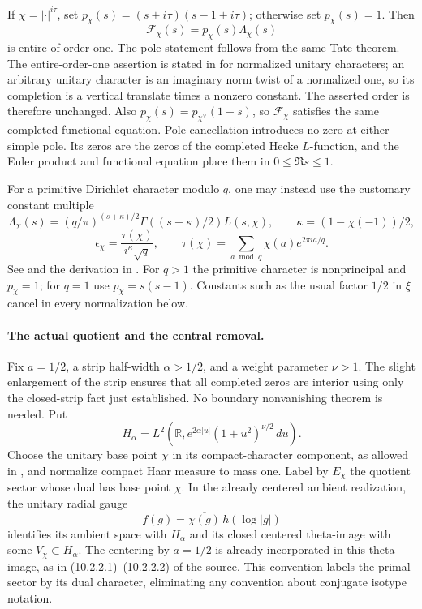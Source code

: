 \documentclass[11pt,a4paper]{article}
\newcommand{\R}{\mathbb R}
\begin{document}
If $\chi=|\cdot|^{i\tau}$, set $p_\chi(s)=(s+i\tau)(s-1+i\tau)$; otherwise set $p_\chi(s)=1$. Then
\[
 \mathcal F_\chi(s)=p_\chi(s)\Lambda_\chi(s)
\]
is entire of order one. The pole statement follows from the same Tate theorem. The entire-order-one assertion is stated in \cite[\S1, p.~282]{rajan1998} for normalized unitary characters; an arbitrary unitary character is an imaginary norm twist of a normalized one, so its completion is a vertical translate times a nonzero constant. The asserted order is therefore unchanged. Also $p_\chi(s)=p_{\chi^\vee}(1-s)$, so $\mathcal F_\chi$ satisfies the same completed functional equation. Pole cancellation introduces no zero at either simple pole. Its zeros are the zeros of the completed Hecke $L$-function, and the Euler product and functional equation place them in $0\le\Re s\le1$.

For a primitive Dirichlet character modulo $q$, one may instead use the customary constant multiple
\[
 \Lambda_\chi(s)=(q/\pi)^{(s+\kappa)/2}
 \Gamma((s+\kappa)/2)L(s,\chi),\qquad
 \kappa=(1-\chi(-1))/2,
\]
\[
 \epsilon_\chi=\frac{\tau(\chi)}{i^\kappa\sqrt q},\qquad
 \tau(\chi)=\sum_{a\bmod q}\chi(a)e^{2\pi ia/q}.
\]
See \cite[(25.15.5)--(25.15.6)]{dlmf2515} and the derivation in \cite[\S6.1; (6.2.2)]{kedlayaFE}. For $q>1$ the primitive character is nonprincipal and $p_\chi=1$; for $q=1$ use $p_\chi=s(s-1)$. Constants such as the usual factor $1/2$ in $\xi$ cancel in every normalization below.

\paragraph{The actual quotient and the central removal.}
Fix $a=1/2$, a strip half-width $\alpha>1/2$, and a weight parameter $\nu>1$. The slight enlargement of the strip ensures that all completed zeros are interior using only the closed-strip fact just established. No boundary nonvanishing theorem is needed. Put
\[
 H_\alpha=L^2(\R,e^{2\alpha|u|}(1+u^2)^{\nu/2}\,du).
\]
Choose the unitary base point $\chi$ in its compact-character component, as allowed in \cite[Notation 10.2.2.1, p.~445]{masullo}, and normalize compact Haar measure to mass one. Label by $E_\chi$ the quotient sector whose dual has base point $\chi$. In the already centered ambient realization, the unitary radial gauge
\[
 f(g)=\overline{\chi(g)}\,h(\log|g|)
\]
identifies its ambient space with $H_\alpha$ and its closed centered theta-image with some $V_\chi\subset H_\alpha$. The centering by $a=1/2$ is already incorporated in this theta-image, as in (10.2.2.1)--(10.2.2.2) of the source. This convention labels the primal sector by its dual character, eliminating any convention about conjugate isotype notation.
\end{document}
